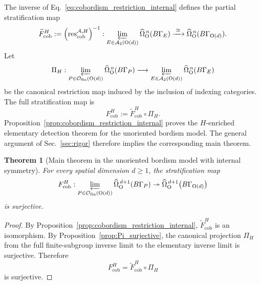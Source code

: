 \documentclass[aps,prx,reprint,superscriptaddress,twocolumn,amsmath,amssymb,amsfonts, nofootinbib]{revtex4-2}
\newcommand{\res}{\text{res}}
\theoremstyle{apsstyle}
\newtheorem{theorem}{Theorem}[section]
\begin{document}
\noindent The inverse of Eq.~\eqref{eq:cobordism_restriction_internal} defines the partial stratification map
\begin{equation}
    \widetilde F_{\mathrm{cob}}^{H}
    :=
    \left(
        \res_{\mathrm{cob}}^{\mathcal A,H}
    \right)^{-1}:
    \varprojlim_{E\in\mathcal A_2(\mathrm O(d))}
    \widehat{\Omega}_{\mathrm O}^{\,n}(B\Gamma_E)
    \xrightarrow{\;\cong\;}
    \widehat{\Omega}_{\mathrm O}^{\,n}(B\Gamma_{\mathrm{O}(d)}).
\end{equation}
Let
\begin{equation*}
    \Pi_H:
    \varprojlim_{P\in\mathcal O_{\mathrm{fin}}(\mathrm O(d))}
    \widehat{\Omega}_{\mathrm O}^{\,n}(B\Gamma_P)
    \longrightarrow
    \varprojlim_{E\in\mathcal A_2(\mathrm O(d))}
    \widehat{\Omega}_{\mathrm O}^{\,n}(B\Gamma_E)
\end{equation*}
be the canonical restriction map induced by the inclusion of indexing
categories. The full stratification map is
\begin{equation}
    F_{\mathrm{cob}}^{H}
    :=
    \widetilde F_{\mathrm{cob}}^{H}\circ\Pi_H.
    \label{eq:full_cobordism_stratification_internal}
\end{equation}
Proposition~\ref{prop:cobordism_restriction_internal} proves the
$H$-enriched elementary detection theorem for the unoriented bordism
model. The general argument of Sec.~\ref{sec:rigor} therefore implies
the corresponding main theorem.

\bigskip

\begin{theorem}[Main theorem in the unoriented bordism model with internal symmetry]
\label{appJ:main_theorem_cobordism_internal}
For every spatial dimension $d\geq1$, the stratification map
\begin{equation}
    F_{\mathrm{cob}}^{H}:
    \varprojlim_{P\in\mathcal O_{\mathrm{fin}}(\mathrm O(d))}
    \widehat{\Omega}_{\mathrm O}^{\,d+1}(B\Gamma_P)
    \twoheadrightarrow
    \widehat{\Omega}_{\mathrm O}^{\,d+1}
    \bigl(B\Gamma_{\mathrm O(d)}\bigr)
\end{equation}
is surjective.
\end{theorem}

\begin{proof}
By Proposition~\ref{prop:cobordism_restriction_internal},
$\widetilde F_{\mathrm{cob}}^{H}$ is an isomorphism. By
Proposition~\ref{prop:Pi_surjective}, the canonical projection
$\Pi_H$ from the full finite-subgroup inverse limit to the elementary
inverse limit is surjective. Therefore
\begin{equation*}
    F_{\mathrm{cob}}^{H}
    =
    \widetilde F_{\mathrm{cob}}^{H}\circ\Pi_H
\end{equation*}
is surjective.
\end{proof}
\end{document}
